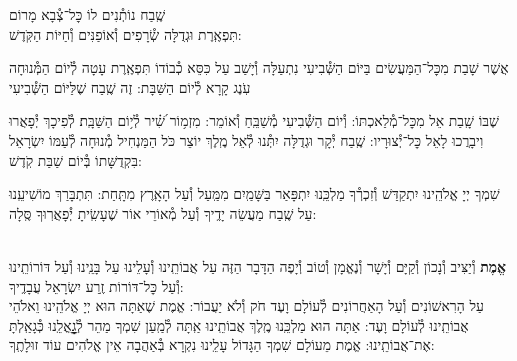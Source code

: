\documentclass[twoside, openany, parskip=half, 11pt]{book}
\begin{document}
\shatz שֶֽׁבַח נוֹתְ֯נִים לוֹ כׇּל־צְ֯בָא מָרוֹם \\
תִּפְאֶֽרֶת וּגְדֻלָּה שְׂ֯רָפִים וְ֯אוֹפַנִּים וְ֯חַיּוֹת הַקֹּֽדֶשׁ:

\chazzan {}
אֲשֶׁר שָׁבַת מִכׇּל־הַמַּעֲשִׂים בַּיּוֹם הַשְּׁ֯בִיעִי נִתְעַלָּה וְ֯יָשַׁב עַל כִּסֵּא כְ֯בוֹדוֹ תִּפְאֶֽרֶת עָטָה לְ֯יוֹם הַמְּ֯נוּחָה עֹֽנֶג קָרָא לְ֯יוֹם הַשַּׁבָּת: זֶה שֶֽׁבַח שֶׁלַּיּוֹם הַשְּׁ֯בִיעִי

\kahal
שֶׁבּוֹ שָֽׁבַת אֵל מִכׇּל־מְ֯לַאכְתּוֹ: וְ֯יוֹם הַשְּׁ֯בִיעִי מְ֯שַׁבֵּֽחַ וְ֯אוֹמֵר:
%
מִזְמ֥וֹר שִׁ֝֗יר לְ֯י֥וֹם הַשַּׁבָּֽת׃ לְ֯פִיכָךְ יְ֯פָאֲרוּ וִיבָרֲכוּ לָאֵל כׇּל־יְ֯צוּרָיו: שֶֽׁבַח יְ֯קָר וּגְדֻלָּה יִתְּ֯נוּ לְ֯אֵל מֶֽלֶךְ יוֹצֵר כֹּל הַמַּנְחִיל מְ֯נוּחָה לְ֯עַמּוֹ יִשְׂרָאֵל בִּקְדֻשָּׁתוֹ בְּ֯יוֹם שַׁבַּת קֹֽדֶשׁ:

\chazzan
שִׁמְךָ יְיָ אֱלֹהֵֽינוּ יִתְקַדַּשׁ וְ֯זִכְרְ֯ךָ מַלְכֵּֽנוּ יִתְפָּאַר בַּשָּׁמַֽיִם מִמַּֽעַל וְ֯עַל הָאָֽרֶץ מִתָּֽחַת:
תִּתְבָּרַךְ מוֹשִׁיעֵֽנוּ עַל שֶֽׁבַח מַעֲשֵׂה יָדֶֽיךָ וְ֯עַל מְ֯אוֹרֵי אוֹר שֶׁעָשִֽׂיתָ יְ֯פָאֲרֽוּךָ סֶּֽלָה:


\label{tisbarach}
\yotzerhameoros

\ahavaraba

\shema

\veahavta

\vehaya

\vayomer{}

 \smallskip

\begin{paracol}{2}
\\
\textbf{
אֱמֶת
}
וְ֯יַצִּיב וְ֯נָכוֹן וְ֯קַיָּם וְ֯יָשָׁר וְ֯נֶאֱמָן וְ֯טוֹב וְ֯יָפֶה הַדָּבָר הַזֶּה עַל אֲבוֹתֵֽינוּ וְ֯עָלֵינוּ עַל בָּנֵֽינוּ וְ֯עַל דּוֹרוֹתֵֽינוּ וְ֯עַל כׇּל־דּוֹרוֹת זֶֽרַע יִשְׂרָאֵל עֲבָדֶֽיךָ:\\
עַל הָרִאשׁוֹנִים וְ֯עַל הָאַחֲרוֹנִים לְ֯עוֹלָם וָעֶד חֹק וְ֯לֹא יַעֲבוֹר: אֱמֶת שֶׁאַתָּה הוּא יְיָ אֱלֹהֵֽינוּ וֵאלֹהֵי אֲבוֹתֵֽינוּ לְ֯עוֹלָם וָעֶד: אַתָּה הוּא מַלְכֵּֽנוּ מֶֽלֶךְ אֲבוֹתֵֽינוּ אַֽתָּה לְ֯מַֽעַן שִׁמְךָ מַהֵר לְ֯גׇׇׇׇׇׇׇאֳלֵֽנוּ כְּ֯גָאַֽלְתָּ אֶת־אֲבוֹתֵֽינוּ: אֱמֶת מֵעוֹלָם שִׁמְךָ הַגָּדוֹל עָלֵֽינוּ נִקְרָא בְּ֯אַהֲבָה אֵין אֱלֹהִים עוֹד זוּלָתֶֽךָ:

\switchcolumn

\emesveyatziv

\end{paracol}

\ezrasavoseinu

\clearpage

\gaalyisroel
\end{document}
